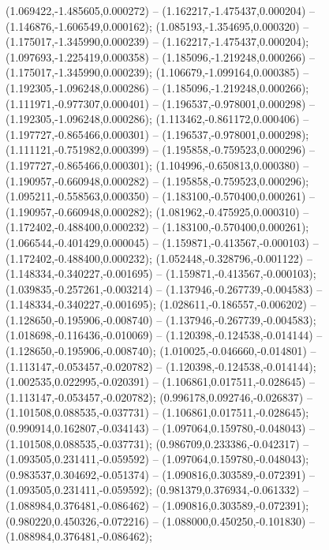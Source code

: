  (1.069422,-1.485605,0.000272) -- (1.162217,-1.475437,0.000204) -- (1.146876,-1.606549,0.000162);
 (1.085193,-1.354695,0.000320) -- (1.175017,-1.345990,0.000239) -- (1.162217,-1.475437,0.000204);
 (1.097693,-1.225419,0.000358) -- (1.185096,-1.219248,0.000266) -- (1.175017,-1.345990,0.000239);
 (1.106679,-1.099164,0.000385) -- (1.192305,-1.096248,0.000286) -- (1.185096,-1.219248,0.000266);
 (1.111971,-0.977307,0.000401) -- (1.196537,-0.978001,0.000298) -- (1.192305,-1.096248,0.000286);
 (1.113462,-0.861172,0.000406) -- (1.197727,-0.865466,0.000301) -- (1.196537,-0.978001,0.000298);
 (1.111121,-0.751982,0.000399) -- (1.195858,-0.759523,0.000296) -- (1.197727,-0.865466,0.000301);
 (1.104996,-0.650813,0.000380) -- (1.190957,-0.660948,0.000282) -- (1.195858,-0.759523,0.000296);
 (1.095211,-0.558563,0.000350) -- (1.183100,-0.570400,0.000261) -- (1.190957,-0.660948,0.000282);
 (1.081962,-0.475925,0.000310) -- (1.172402,-0.488400,0.000232) -- (1.183100,-0.570400,0.000261);
 (1.066544,-0.401429,0.000045) -- (1.159871,-0.413567,-0.000103) -- (1.172402,-0.488400,0.000232);
 (1.052448,-0.328796,-0.001122) -- (1.148334,-0.340227,-0.001695) -- (1.159871,-0.413567,-0.000103);
 (1.039835,-0.257261,-0.003214) -- (1.137946,-0.267739,-0.004583) -- (1.148334,-0.340227,-0.001695);
 (1.028611,-0.186557,-0.006202) -- (1.128650,-0.195906,-0.008740) -- (1.137946,-0.267739,-0.004583);
 (1.018698,-0.116436,-0.010069) -- (1.120398,-0.124538,-0.014144) -- (1.128650,-0.195906,-0.008740);
 (1.010025,-0.046660,-0.014801) -- (1.113147,-0.053457,-0.020782) -- (1.120398,-0.124538,-0.014144);
 (1.002535,0.022995,-0.020391) -- (1.106861,0.017511,-0.028645) -- (1.113147,-0.053457,-0.020782);
 (0.996178,0.092746,-0.026837) -- (1.101508,0.088535,-0.037731) -- (1.106861,0.017511,-0.028645);
 (0.990914,0.162807,-0.034143) -- (1.097064,0.159780,-0.048043) -- (1.101508,0.088535,-0.037731);
 (0.986709,0.233386,-0.042317) -- (1.093505,0.231411,-0.059592) -- (1.097064,0.159780,-0.048043);
 (0.983537,0.304692,-0.051374) -- (1.090816,0.303589,-0.072391) -- (1.093505,0.231411,-0.059592);
 (0.981379,0.376934,-0.061332) -- (1.088984,0.376481,-0.086462) -- (1.090816,0.303589,-0.072391);
 (0.980220,0.450326,-0.072216) -- (1.088000,0.450250,-0.101830) -- (1.088984,0.376481,-0.086462);
